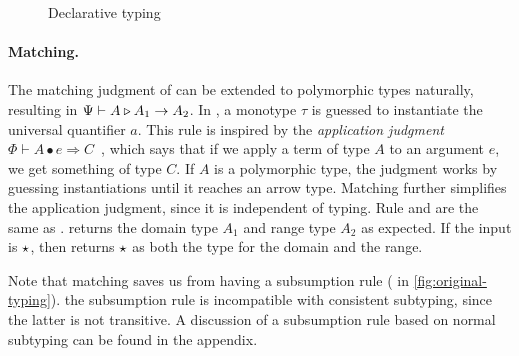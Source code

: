 \renewcommand{\trto}[1]{\hlmath{\rightsquigarrow{#1}}}
\begin{figure}[t]
  \begin{small}

  \end{small}
  \caption{Declarative typing}
  \label{fig:decl-typing}
\end{figure}

\paragraph{Matching.} The matching judgment of
\citet{siek2015refined} can be extended to polymorphic types naturally,
resulting in $\Psi {} \vdash A \triangleright A_1 \to A_2$. In , a monotype
$\tau$ is guessed to instantiate the universal quantifier $a$. This rule is
inspired by the \textit{application judgment} $\Phi \vdash A \bullet e
\Rightarrow C$~\citep{dunfield2013complete}, which says that if we apply a term
of type $A$ to an argument $e$, we get something of type $C$. If $A$ is a
polymorphic type, the judgment works by guessing instantiations
until it reaches an arrow type. Matching further simplifies the
application judgment, since it is independent of typing. Rule  and 
are the same as \citet{siek2015refined}.  returns the domain type $A_1$
and range type $A_2$ as expected. If the input is $\star$, then
 returns $\star$ as both the type for the domain and the range.

Note that matching saves us from having a subsumption rule ( in
\cref{fig:original-typing}).
the subsumption rule is incompatible with consistent subtyping, since the latter
is not transitive. A discussion of a subsumption rule based on normal
  subtyping can be found in the appendix.


